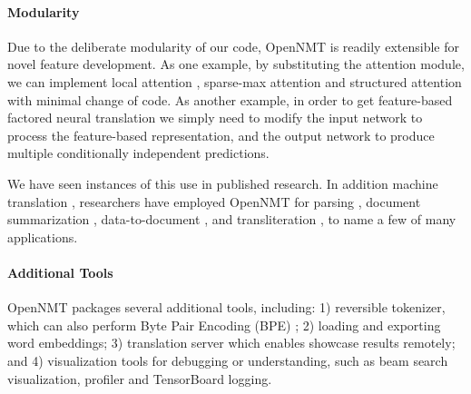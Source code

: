 \documentclass[]{article}
\begin{document}
\paragraph{Modularity}
Due to the deliberate modularity of our code, OpenNMT is readily extensible for novel feature development. As one example, by substituting the attention module, we can implement local attention \citep{Luong2015}, sparse-max attention
\citep{martins2016softmax} and structured attention \citep{kim2017structured} with minimal change of code. As another example, in order to get feature-based factored neural translation \citep{sennrich2016linguistic} we simply need to modify the input network to process the feature-based representation, and the output network to produce multiple conditionally independent predictions.

We have seen instances of this use in published research. In addition
machine translation
\citep{levin2017toward,ha2017effective,sharaf2017umd,sekizawa2017improving,ma2017osu},
researchers have employed OpenNMT for parsing \citep{van2017neural},
document summarization \citep{ling2017coarse}, data-to-document
\citep{wiseman2017challenges,gardent2017webnlg}, and transliteration
\citep{ameur2017arabic}, to name a few of many applications.


\paragraph{Additional Tools}

OpenNMT packages several additional tools, including: 1) reversible tokenizer, which can also perform Byte Pair Encoding (BPE) \citep{DBLP:journals/corr/SennrichHB15}; 2) loading and exporting word embeddings; 3) translation server which enables showcase results remotely; and 4) visualization tools for debugging or understanding, such as beam search visualization, profiler and TensorBoard logging.
\end{document}

